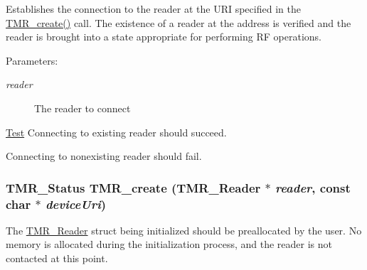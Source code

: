 Establishes the connection to the reader at the URI specified in the \hyperlink{group__reader_g77b9edd8d948ab1e1d9b95bf546cc43e}{TMR\_\-create()} call. The existence of a reader at the address is verified and the reader is brought into a state appropriate for performing RF operations.

\begin{Desc}
\item[Parameters:]
\begin{description}
\item[{\em reader}]The reader to connect\end{description}
\end{Desc}
\begin{Desc}
\item[\hyperlink{test__test000003}{Test}]Connecting to existing reader should succeed. 

Connecting to nonexisting reader should fail. \end{Desc}
\hypertarget{group__reader_g77b9edd8d948ab1e1d9b95bf546cc43e}{
\subsubsection[{TMR\_\-create}]{\setlength{\rightskip}{0pt plus 5cm}TMR\_\-Status TMR\_\-create ({\bf TMR\_\-Reader} $\ast$ {\em reader}, \/  const char $\ast$ {\em deviceUri})}}
\label{group__reader_g77b9edd8d948ab1e1d9b95bf546cc43e}


The \hyperlink{struct_t_m_r___reader}{TMR\_\-Reader} struct being initialized should be preallocated by the user. No memory is allocated during the initialization process, and the reader is not contacted at this point.

